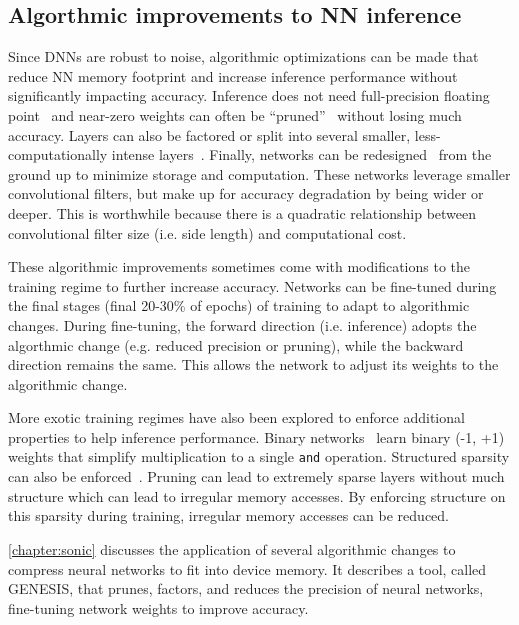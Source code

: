 \subsection{Algorthmic improvements to NN inference}
\label{chapter:background:inference:algorithm}
Since DNNs are robust to noise, algorithmic optimizations can be made that reduce NN memory footprint and increase inference performance without significantly impacting accuracy.
% 
Inference does not need full-precision floating point~\cite{han:isca16:eie,desa:isca17:sgd} and near-zero weights can often be ``pruned''~\cite{nabhan1994toward, han:iclr16:deep-compression,nakkiran:interspeech15:compressing,bhattacharya2016sparsification} without losing much accuracy.
% 
Layers can also be factored or split into several smaller, less-computationally intense layers~\cite{szegedy2017inception,szegedy2016rethinking,chollet2016xception}.
% 
Finally, networks can be redesigned~\cite{iandola:arxiv16:squeezenet,tan2019efficientnet,sandler2018mobilenetv2} from the ground up to minimize storage and computation.
% 
These networks leverage smaller convolutional filters, but make up for accuracy degradation by being wider or deeper.
% 
This is worthwhile because there is a quadratic relationship between convolutional filter size (i.e. side length) and computational cost.

These algorithmic improvements sometimes come with modifications to the training regime to further increase accuracy.
% 
Networks can be fine-tuned during the final stages (final 20-30\% of epochs) of training to adapt to algorithmic changes.
% 
During fine-tuning, the forward direction (i.e. inference) adopts the algorthmic change (e.g. reduced precision or pruning), while the backward direction remains the same.
% 
This allows the network to adjust its weights to the algorithmic change.

More exotic training regimes have also been explored to enforce additional properties to help inference performance.
% 
Binary networks~\cite{lin2018binary} learn binary (-1, +1) weights that simplify multiplication to a single {\tt and} operation.
% 
Structured sparsity can also be enforced~\cite{deng2018permdnn,nakkiran:interspeech15:compressing,}.
% 
Pruning can lead to extremely sparse layers without much structure which can lead to irregular memory accesses.
% 
By enforcing structure on this sparsity during training, irregular memory accesses can be reduced.

\autoref{chapter:sonic} discusses the application of several algorithmic changes to compress neural networks to fit into device memory.
%
It describes a tool, called GENESIS, that prunes, factors, and reduces the precision of neural networks, fine-tuning network weights to improve accuracy.

